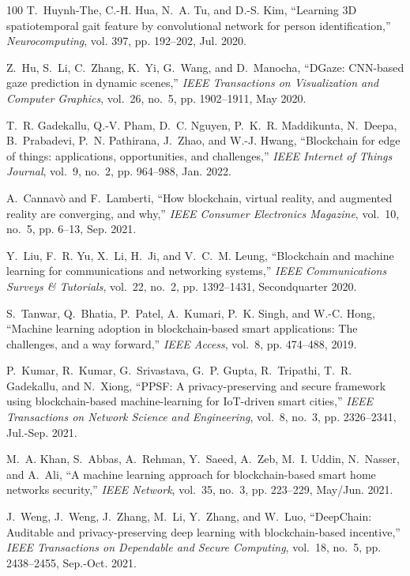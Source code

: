 \documentclass[journal]{IEEEtran}
\begin{document}
\begin{thebibliography}{100}
	T.~Huynh-The, C.-H. Hua, N.~A. Tu, and D.-S. Kim, ``Learning {3D}
	spatiotemporal gait feature by convolutional network for person
	identification,'' \emph{Neurocomputing}, vol. 397, pp. 192--202, Jul. 2020.
	
	Z.~Hu, S.~Li, C.~Zhang, K.~Yi, G.~Wang, and D.~Manocha, ``{DGaze: CNN}-based
	gaze prediction in dynamic scenes,'' \emph{IEEE Transactions on Visualization
		and Computer Graphics}, vol.~26, no.~5, pp. 1902--1911, May 2020.
	
	T.~R. Gadekallu, Q.-V. Pham, D.~C. Nguyen, P.~K.~R. Maddikunta, N.~Deepa,
	B.~Prabadevi, P.~N. Pathirana, J.~Zhao, and W.-J. Hwang, ``Blockchain for
	edge of things: applications, opportunities, and challenges,'' \emph{IEEE
		Internet of Things Journal}, vol.~9, no.~2, pp. 964--988, Jan. 2022.
	
	A.~Cannavò and F.~Lamberti, ``How blockchain, virtual reality, and augmented
	reality are converging, and why,'' \emph{IEEE Consumer Electronics Magazine},
	vol.~10, no.~5, pp. 6--13, Sep. 2021.
	
	Y.~Liu, F.~R. Yu, X.~Li, H.~Ji, and V.~C.~M. Leung, ``Blockchain and machine
	learning for communications and networking systems,'' \emph{IEEE
		Communications Surveys \& Tutorials}, vol.~22, no.~2, pp. 1392--1431,
	{Secondquarter} 2020.
	
	S.~Tanwar, Q.~Bhatia, P.~Patel, A.~Kumari, P.~K. Singh, and W.-C. Hong,
	``Machine learning adoption in blockchain-based smart applications: The
	challenges, and a way forward,'' \emph{IEEE Access}, vol.~8, pp. 474--488,
	2019.
	
	P.~Kumar, R.~Kumar, G.~Srivastava, G.~P. Gupta, R.~Tripathi, T.~R. Gadekallu,
	and N.~Xiong, ``{PPSF}: A privacy-preserving and secure framework using
	blockchain-based machine-learning for {IoT}-driven smart cities,'' \emph{IEEE
		Transactions on Network Science and Engineering}, vol.~8, no.~3, pp.
	2326--2341, Jul.-Sep. 2021.
	
	M.~A. Khan, S.~Abbas, A.~Rehman, Y.~Saeed, A.~Zeb, M.~I. Uddin, N.~Nasser, and
	A.~Ali, ``A machine learning approach for blockchain-based smart home
	networks security,'' \emph{IEEE Network}, vol.~35, no.~3, pp. 223--229,
	May/Jun. 2021.
	
	J.~Weng, J.~Weng, J.~Zhang, M.~Li, Y.~Zhang, and W.~Luo, ``{DeepChain}:
	Auditable and privacy-preserving deep learning with blockchain-based
	incentive,'' \emph{IEEE Transactions on Dependable and Secure Computing},
	vol.~18, no.~5, pp. 2438--2455, Sep.-Oct. 2021.
	

\end{thebibliography}
\end{document}
